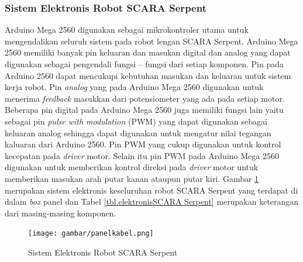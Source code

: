 \subsubsection{Sistem Elektronis Robot SCARA Serpent}
Arduino Mega 2560 digunakan sebagai mikrokontroler utama untuk mengendalikan seluruh sistem pada robot lengan SCARA Serpent. Arduino Mega 2560 memiliki banyak pin keluaran dan masukan digital dan analog yang dapat digunakan sebagai pengendali fungsi – fungsi dari setiap komponen. Pin pada Arduino  2560 dapat mencukupi kebutuhan masukan dan keluaran untuk sistem kerja robot. Pin \textit{analog} yang pada Arduino Mega 2560 digunakan untuk menerima \textit{feedback} masukkan dari potensiometer yang ada pada setiap motor. Beberapa pin digital pada Arduino Mega 2560 juga  memiliki fungsi lain yaitu sebagai pin \textit{pulse with modulation} (PWM) yang dapat digunakan sebagai keluaran analog sehingga dapat digunakan untuk mengatur nilai tegangan kaluaran dari Arduino  2560. Pin PWM yang cukup digunakan untuk kontrol kecepatan pada \textit{driver} motor. Selain itu pin PWM pada Arduino Mega 2560 digunakan untuk memberikan kontrol direksi pada \textit{driver} motor untuk memberikan masukan arah putar kanan ataupun putar kiri. Gambar \ref{pic.boxpanelkabel} merupakan sistem elektronis keseluruhan robot SCARA Serpent yang terdapat di dalam \textit{box} panel dan Tabel \ref{tbl.elektronisSCARA Serpent} merupakan keterangan dari masing-masing komponen.
\begin{figure}[H]
	\centering
	\texttt{[image: gambar/panelkabel.png]}
	\caption{Sistem Elektronis Robot SCARA Serpent}
	\label{pic.boxpanelkabel}
\end{figure}
